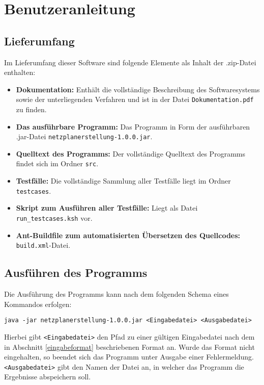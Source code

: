 \chapter{Benutzeranleitung}
\label{Benutzeranleitung}

\section{Lieferumfang}

Im Lieferumfang dieser Software sind folgende Elemente als Inhalt der
.zip-Datei enthalten:
\begin{itemize}
  \item \textbf{Dokumentation:} Enth\"alt die vollst\"andige
    Beschreibung des Softwaresystems sowie der unterliegenden
    Verfahren und ist in
    der Datei \texttt{Dokumentation.pdf} zu finden.
  \item \textbf{Das ausf\"uhrbare Programm:} Das Programm in Form
    der ausf\"uhrbaren .jar-Datei
    \texttt{netzplanerstellung-1.0.0.jar}.
  \item \textbf{Quelltext des Programms:} Der vollst\"andige Quelltext
    des Programms findet sich im Ordner \texttt{src}.
  \item \textbf{Testf\"alle:} Die vollst\"andige Sammlung aller
    Testf\"alle liegt im Ordner \texttt{testcases}.
  \item \textbf{Skript zum Ausf\"uhren aller Testf\"alle:} Liegt als
    Datei \texttt{run\_testcases.ksh} vor.
  \item \textbf{Ant-Buildfile zum automatisierten \"Ubersetzen des
    Quellcodes:} \texttt{build.xml}-Datei.
\end{itemize}

\section{Ausf\"uhren des Programms}

Die Ausf\"uhrung des Programms kann nach dem folgenden Schema eines
Kommandos erfolgen:
\begin{verbatim}
java -jar netzplanerstellung-1.0.0.jar <Eingabedatei> <Ausgabedatei>
\end{verbatim}
Hierbei gibt \texttt{<Eingabedatei>} den Pfad zu einer g\"ultigen
Eingabedatei nach dem in Abschnitt \ref{eingabeformat} beschriebenen
Format an. Wurde das Format nicht eingehalten, so beendet sich das
Programm unter Ausgabe einer Fehlermeldung.
\texttt{<Ausgabedatei>} gibt den Namen der Datei an, in welcher das
Programm die Ergebnisse abspeichern soll.

